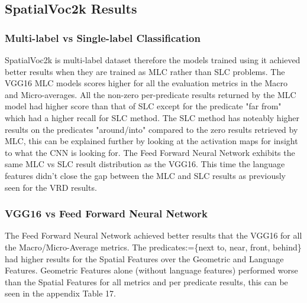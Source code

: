\documentclass{csfyp}
\begin{document}
\subsection{SpatialVoc2k Results}

\subsubsection{Multi-label vs Single-label Classification}
SpatialVoc2k is multi-label dataset therefore the models trained using it achieved better results when they are trained as MLC rather than SLC problems. The VGG16 MLC models scores higher for all the evaluation metrics in the Macro and Micro-averages. All the non-zero per-\Gls{predicate} results returned by the MLC model had higher score than that of SLC except for the \Gls{predicate} "far from" which had a higher recall for SLC method. The SLC method has noteably higher results on the \Gls{predicate}s "around/into" compared to the zero results retrieved by MLC, this can be explained further by looking at the activation maps for insight to what the CNN is looking for. The Feed Forward Neural Network exhibits the same MLC vs SLC result distribution as the VGG16. This time the language features didn't close the gap between the MLC and SLC results as previously seen for the VRD results.

\subsubsection{VGG16 vs Feed Forward Neural Network}
The Feed Forward Neural Network achieved better results that the VGG16 for all the Macro/Micro-Average metrics.
The \Gls{predicate}s:=\{next to, near, front, behind\} had higher results for the Spatial Features over the Geometric and Language Features. Geometric Features alone (without language features) performed worse than the Spatial Features for all metrics and per \Gls{predicate} results, this can be seen in the appendix Table 17.
\end{document}
